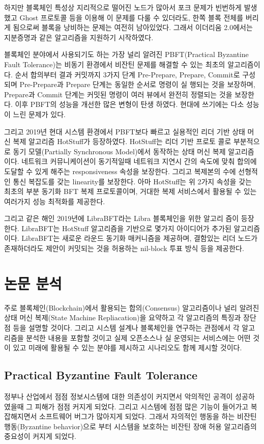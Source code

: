 하지만 블록체인 특성상 지리적으로 떨어진 노드가 많아서 포크 문제가 빈번하게 발생했고
Ghost 프로토콜 등을 이용해 이 문제를 다룰 수 있더라도, 한쪽 블록 전체를 버리게 됨으로써 
블록을 낭비하는 문제는 여전히 남아있었다. 그래서 이더리움 2.0에서는 지분증명과
같은 알고리즘을 지원하기 시작하였다.

블록체인 분야에서 사용되기도 하는
가장 널리 알려진 PBFT(Practical Byzantine Fault Tolerance)는 비동기 환경에서 비잔틴 문제를 해결할 수 있는
최초의 알고리즘이다. 순서 합의부터 결과 커밋까지 3가지 단계 Pre-Prepare, Prepare,
Commit로 구성되며 Pre-Prepare과 Prepare 단계는 동일한 순서로 명령이 실
행되는 것을 보장하며, Prepare과 Commit 단계는 커밋된 명령이 여러 뷰에서
완전히 정렬되는 것을 보장한다. 이후 PBFT의 성능을 개선한 많은 변형이 탄생
하였다. 현대에 쓰기에는 다소 성능이 느린 문제가 있다.

그리고 2019년 현대 시스템 환경에서 PBFT보다 빠르고 실용적인 리더 기반
상태 머신 복제 알고리즘 HotStuff가 등장하였다. HotStuff는 리더 기반 프로토
콜로 부분적으로 동기 모델(Partially Synchronous Model)에서 동작하는 상태
머신 복제 알고리즘이다. 네트워크 커뮤니케이션이 동기적일때 네트워크 지연시
간의 속도에 맞춰 합의에 도달할 수 있게 해주는 responsiveness 속성을 보장한다.
그리고 복제본의 수에 선형적인 통신 복잡도를 갖는 linearity를 보장한다. 아마
HotStuff는 위 2가지 속성을 갖는 최초의 부분 동기화 BFT 복제 프로토콜이며,
거대한 복제 서비스에서 활용될 수 있는 여러가지 성능 최적화를 제공한다.

그리고 같은 해인 2019년에 LibraBFT라는 Libra 블록체인을 위한 알고리
즘이 등장한다. LibraBFT는 HotStuff 알고리즘을 기반으로 몇가지 아이디어가
추가된 알고리즘이다. LibraBFT는 새로운 라운드 동기화 매커니즘을 제공하며,
결함있는 리더 노드가 존재하더라도 제안이 커밋되는 것을 허용하는 nil-block
투표 방식 등을 제공한다.


\section{논문 분석}
\label{sec:1}
주로 블록체인(Blockchain)에서 활용되는 합의(Consensus) 알고리즘이나
널리 알려진 상태 머신 복제(State Machine Repliacation)을 요약하고
각 알고리즘의 특징과 장단점 등을 설명할 것이다. 그리고 시스템 설계나
블록체인을 연구하는 관점에서 각 알고리즘을 분석한 내용을 포함할 것이고
실제 오픈소스나 실 운영되는 서비스에는 어떤 것이 있고 
미래에 활용될 수 있는 분야를 제시하고 시나리오도 함께 제시할 것이다.

\subsection{Practical Byzantine Fault Tolerance}
정부나 산업에서 점점 정보시스템에 대한
의존성이 커지면서 악의적인 공격이 성공하였을때 그 피해가 점점 커지게 되었다.
그리고 시스템에 점점 많은 기능이 들어가고 복잡해지면서 소프트웨어 버그가 많아지게 되었다.
그래서 자의적인 행동을 하는 비잔틴 행동(Byzantine behavior)으로 부터 시스템을
보호하는 비잔틴 장애 허용 알고리즘의 중요성이 커지게 되었다.

